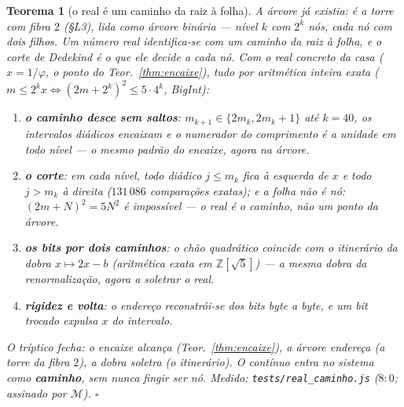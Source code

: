 \documentclass[11pt,a4paper]{article}
\newtheorem{teorema}{Teorema}
\newcommand{\code}[1]{\texttt{\small #1}}
\begin{document}
\begin{teorema}[o real é um caminho da raiz à folha]\label{thm:real-caminho}
A árvore já existia: é a torre com fibra $2$ (\S L3), lida como árvore
binária --- nível $k$ com $2^{k}$ nós, cada nó com dois filhos. Um
número real identifica-se com um \emph{caminho da raiz à folha}, e o
corte de Dedekind é o que ele decide a cada nó. Com o real concreto da
casa ($x=1/\varphi$, o ponto do Teor.~\ref{thm:encaixe}), tudo por
aritmética inteira exata ($m\le2^{k}x\iff(2m+2^{k})^{2}\le5\cdot4^{k}$,
BigInt):
\begin{enumerate}
\item \textbf{o caminho desce sem saltos}: $m_{k+1}\in\{2m_{k},
2m_{k}{+}1\}$ até $k=40$, os intervalos diádicos encaixam e o
numerador do comprimento é a \emph{unidade} em todo nível --- o mesmo
padrão do encaixe, agora na árvore.
\item \textbf{o corte}: em cada nível, todo diádico $j\le m_{k}$
fica à esquerda de $x$ e todo $j>m_{k}$ à direita ($131\,086$
comparações exatas); e a folha \emph{não é nó}:
$(2m+N)^{2}=5N^{2}$ é imposs\'ivel --- o real é o caminho, não um
ponto da árvore.
\item \textbf{os bits por dois caminhos}: o chão quadrático coincide
com o \emph{itinerário da dobra} $x\mapsto2x-b$ (aritmética exata em
$\mathbb{Z}[\sqrt5]$) --- a mesma dobra da renormalização, agora a
soletrar o real.
\item \textbf{rigidez e volta}: o endereço reconstrói-se dos bits
byte a byte, e um bit trocado \emph{expulsa} $x$ do intervalo.
\end{enumerate}
O tríptico fecha: \emph{o encaixe alcança} (Teor.~\ref{thm:encaixe}),
\emph{a árvore endereça} (a torre da fibra $2$), \emph{a dobra
soletra} (o itinerário). O contínuo entra no sistema como
\textbf{caminho}, sem nunca fingir ser nó.
\emph{Medido:} \code{tests/real\_caminho.js} ($8{:}0$; assinado por
$\mathcal{M}$).
$\square$
\end{teorema}
\end{document}
